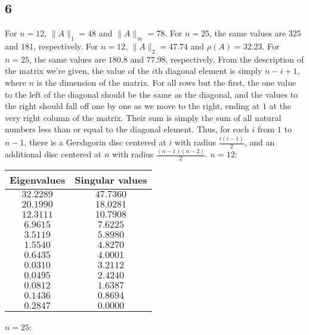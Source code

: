 \documentclass{article}
\begin{document}
\subsection*{6}
For $n=12$, $\|A\|_1=48$ and $\|A\|_\infty=78$. For $n=25$, the same values are $325$ and $181$, respectively.
For $n=12$, $\|A\|_2=47.74$ and $\rho(A)=32.23$. For $n=25$, the same values are $180.8$ and $77.98$, respectively.
From the description of the matrix we're given, the value of the $i$th diagonal element is simply $n-i+1$, where $n$ is the dimension of the matrix. For all rows but the first, the one value to the left of the diagonal should be the same as the diagonal, and the values to the right should fall off one by one as we move to the right, ending at $1$ at the very right column of the matrix. Their sum is simply the sum of all natural numbers less than or equal to the diagonal element. Thus, for each $i$ from $1$ to $n-1$, there is a Gershgorin disc centered at $i$ with radius $\frac{i(i-1)}{2}$, and an additional disc centered at $n$ with radius $\frac{(n-1)(n-2)}{2}$.
$n=12$:

\begin{tabular}{cc}
    Eigenvalues&Singular values\\
     \hline
         $32.2289$&$47.7360$\\
         $20.1990$&$18.0281$\\
         $12.3111$&$10.7908$\\
         $6.9615$&$7.6225$\\
         $3.5119$&$5.8980$\\
         $1.5540$&$4.8270$\\
         $0.6435$&$4.0001$\\
         $0.0310$&$3.2112$\\
         $0.0495$&$2.4240$\\
         $0.0812$&$1.6387$\\
         $0.1436$&$0.8694$\\
         $0.2847$&$0.0000$\\
\end{tabular}

$n=25$:
\end{document}
